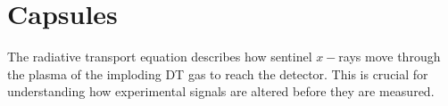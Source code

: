 \section{\label{sec:capsules}Capsules}

The radiative transport equation describes how sentinel $x-$rays move through the plasma of the imploding DT gas to reach the detector. This is crucial for understanding how experimental signals are altered before they are measured.

%
%

\endinput %